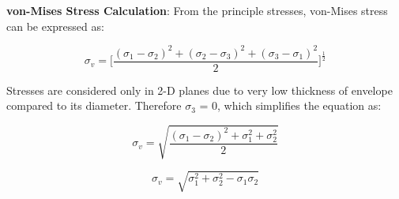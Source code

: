 \textbf{von-Mises Stress Calculation}: From the principle stresses, von-Mises stress can be expressed as:

\begin{equation}
\sigma _{v} = \Bigg[ \frac{(\sigma _{1}  - \sigma _{2})^2 + (\sigma _{2}  - \sigma _{3})^2 + (\sigma _{3}  - \sigma _{1})^2 }{2}   \Bigg]^{\frac{1}{2}}
\end{equation}

Stresses are considered only in 2-D planes due to very low thickness of envelope compared to its diameter. Therefore $ \sigma _{3} $ = 0, which simplifies the equation as:

\begin{equation}
\sigma _{v} = \sqrt{\frac{(\sigma _{1} - \sigma _{2})^{2} + \sigma _{1} ^{2} + \sigma _{2} ^{2}}{2}}
\end{equation}

\begin{equation}
\sigma _{v} = \sqrt{\sigma _{1} ^{2} + \sigma _{2} ^{2} - \sigma _{1} \sigma _{2}}
\end{equation}

